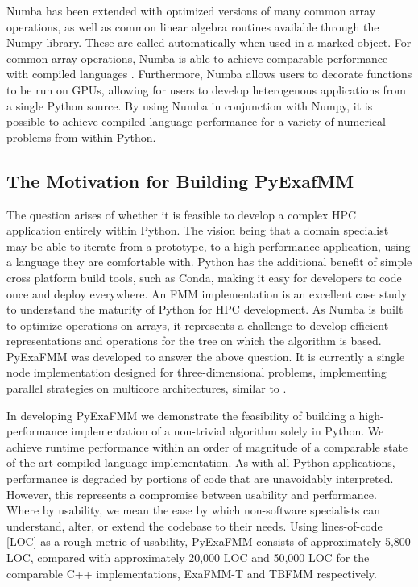\documentclass{IEEEcsmag}
\begin{document}
Numba has been extended with optimized versions of many common array operations, as well as common linear algebra routines available through the Numpy library. These are called automatically when used in a marked object. For common array operations, Numba is able to achieve comparable performance with compiled languages \cite{Lam2015}. Furthermore, Numba allows users to decorate functions to be run on GPUs, allowing for users to develop heterogenous applications from a single Python source. By using Numba in conjunction with Numpy, it is possible to achieve compiled-language performance for a variety of numerical problems from within Python.

\subsection{The Motivation for Building PyExafMM}

The question arises of whether it is feasible to develop a complex HPC application entirely within Python. The vision being that a domain specialist may be able to iterate from a prototype, to a high-performance application, using a language they are comfortable with. Python has the additional benefit of simple cross platform build tools, such as Conda, making it easy for developers to code once and deploy everywhere. An FMM implementation is an excellent case study to understand the maturity of Python for HPC development. As Numba is built to optimize operations on arrays, it represents a challenge to develop efficient representations and operations for the tree on which the algorithm is based. PyExaFMM was developed to answer the above question. It is currently a single node implementation designed for three-dimensional problems, implementing parallel strategies on multicore architectures, similar to \cite{Bramas2020, Wang2021}.

In developing PyExaFMM we demonstrate the feasibility of building a high-performance implementation of a non-trivial algorithm solely in Python. We achieve runtime performance within an order of magnitude of a comparable state of the art compiled language implementation. As with all Python applications, performance is degraded by portions of code that are unavoidably interpreted. However, this represents a compromise between usability and performance. Where by usability, we mean the ease by which non-software specialists can understand, alter, or extend the codebase to their needs. Using lines-of-code [LOC] as a rough metric of usability, PyExaFMM consists of approximately 5,800 LOC, compared with approximately 20,000 LOC and 50,000 LOC for the comparable C++ implementations, ExaFMM-T \cite{Wang2021} and TBFMM \cite{Bramas2020} respectively.
\end{document}
